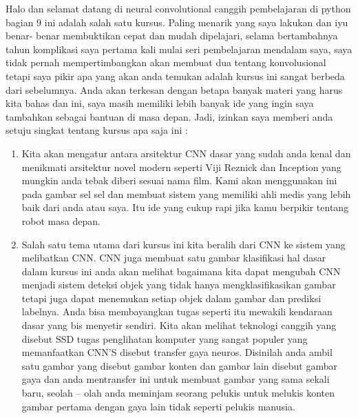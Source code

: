Halo dan selamat datang di neural convolutional canggih pembelajaran di python bagian 9 ini adalah salah satu kursus. Paling menarik yang saya lakukan dan iyu benar- benar membuktikan cepat dan mudah dipelajari, selama bertambahnya tahun komplikasi saya pertama kali mulai seri pembelajaran mendalam saya, saya tidak pernah mempertimbangkan akan membuat dua tentang konvolusional tetapi saya pikir apa yang akan anda temukan adalah kursus ini sangat berbeda dari sebelumnya. Anda akan terkesan dengan betapa banyak materi yang harus kita bahas dan ini, saya masih memiliki lebih banyak ide yang ingin saya tambahkan sebagai bantuan di masa depan.
Jadi, izinkan saya memberi anda setuju singkat tentang kursus apa saja ini	:
\begin{enumerate}
\item Kita akan mengatur antara arsitektur CNN dasar yang sudah anda kenal dan menikmati arsitektur novel modern seperti Viji Reznick dan Inception yang mungkin anda tebak diberi sesuai nama film. Kami akan menggunakan ini pada gambar sel sel dan membuat sistem yang memiliki ahli medis yang lebih baik dari anda atau saya. Itu ide yang cukup rapi jika kamu berpikir tentang robot masa depan.
\item Salah satu tema utama dari kursus ini kita beralih dari CNN ke sistem yang melibatkan CNN. CNN juga membuat satu gambar klasifikasi hal dasar dalam kursus ini anda akan melihat bagaimana kita dapat mengubah CNN menjadi sistem deteksi objek yang tidak hanya mengklasifikasikan gambar tetapi juga dapat menemukan setiap objek dalam gambar dan prediksi labelnya. Anda bisa membayangkan tugas seperti itu mewakili kendaraan dasar yang bis menyetir sendiri. Kita akan melihat teknologi canggih yang disebut SSD tugas penglihatan komputer yang sangat populer yang memanfaatkan CNN’S disebut transfer gaya neuros. Disinilah anda ambil satu gambar yang disebut gambar konten dan gambar lain disebut gambar gaya dan anda mentransfer ini untuk membuat gambar yang sama sekali baru, seolah – olah anda meminjam seorang pelukis untuk melukis konten gambar pertama dengan gaya lain tidak seperti pelukis manusia.
\end{enumerate}


